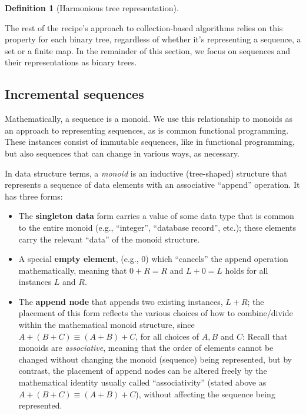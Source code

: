 \documentclass[11pt]{article}
\newtheorem{definition}{Definition}
\begin{document}
\begin{appendices}
\begin{definition}[Harmonious tree representation]
\begin{itemize}
\end{itemize}

\end{definition}

The rest of the recipe's approach to collection-based algorithms
relies on this property for each binary tree, regardless of
whether it's representing a sequence, a set or a finite map.
%
In the remainder of this section, we focus on sequences and their
representations as binary trees.

\subsection{Incremental sequences}

Mathematically, a sequence is a monoid.
%
We use this relationship to monoids as an approach to representing sequences,
as is common functional programming.
%
These instances consist of immutable sequences, like in functional programming,
but also sequences that can change in various ways, as necessary.

In data structure terms, a \emph{monoid} is an inductive (tree-shaped)
structure that represents a sequence of data elements with an associative ``append'' operation.
%
It has three forms:

\begin{itemize}

\item The \textbf{singleton data} form carries a value of some data type that is common to the entire monoid (e.g., ``integer'', ``database record'', etc.); these elements carry the relevant ``data'' of the monoid structure.

\item A special \textbf{empty element}, (e.g., $0$) which ``cancels'' the append operation mathematically, meaning that $0 + R = R$ and $L + 0 = L$ holds for all instances $L$ and $R$.

\item The \textbf{append node} that appends two existing instances, $L + R$; the placement of this form reflects the various choices of how to combine/divide within the mathematical monoid structure, since $A + (B + C) \equiv (A + B) + C$, for all choices of $A, B$ and $C$: Recall that monoids are \emph{associative}, meaning that the order of elements cannot be changed without changing the monoid (sequence) being represented, but by contrast, the placement of append nodes can be altered freely by the mathematical identity usually called ``associativity'' (stated above as $A + (B + C) \equiv (A + B) + C$), without affecting the sequence being represented.


\end{itemize}
\end{appendices}
\end{document}
